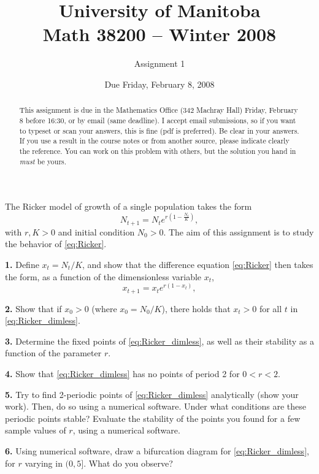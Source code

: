 \documentclass[12pt]{article}
\title{University of Manitoba\\ Math 38200 -- Winter 2008}
\author{Assignment 1}
\date{Due Friday, February 8, 2008}
\theoremstyle{plain}
\begin{document}
\thispagestyle{empty}

\maketitle
\begin{abstract}
This assignment is due in the Mathematics Office (342 Machray Hall) Friday, February 8 before 16:30, or by email (same deadline). I accept email submissions, so if you want to typeset or scan your answers, this is fine (pdf is preferred).
Be clear in your answers. If you use a result in the course notes or from another source, please indicate clearly the reference. You can work on this problem with others, but the solution you hand in \emph{must} be yours. 
\end{abstract}

\vskip1cm
\noindent
The Ricker model of growth of a single population takes the form
\begin{equation}\label{eq:Ricker}
N_{t+1}=N_t e^{r\left(1-\frac{N_t}K\right)},
\end{equation}
with $r,K>0$ and initial condition $N_0>0$. The aim of this assignment is to study the behavior of \eqref{eq:Ricker}.

\vskip1cm
\noindent
{\bf 1.} Define $x_t=N_t/K$, and show that the difference equation \eqref{eq:Ricker} then takes the form, as a function of the dimensionless variable $x_t$,
\begin{equation}\label{eq:Ricker_dimless}
x_{t+1}=x_t e^{r(1-x_t)},
\end{equation}

\vskip0.4cm
\noindent
{\bf 2.} Show that if $x_0>0$ (where $x_0=N_0/K$), there holds that $x_t>0$ for all $t$ in \eqref{eq:Ricker_dimless}.

\vskip0.4cm
\noindent
{\bf 3.} 
Determine the fixed points of \eqref{eq:Ricker_dimless}, as well as their stability as a function of the parameter $r$.

\vskip0.4cm
\noindent
{\bf 4.} 
Show that \eqref{eq:Ricker_dimless} has no points of period 2 for $0<r<2$.

\vskip0.4cm
\noindent
{\bf 5.} 
Try to find 2-periodic points of \eqref{eq:Ricker_dimless} analytically (show your work). Then, do so using a numerical software. Under what conditions are these periodic points stable? Evaluate the stability of the points you found for a few sample values of $r$, using a numerical software.

\vskip0.4cm
\noindent
{\bf 6.} 
Using numerical software, draw a bifurcation diagram for \eqref{eq:Ricker_dimless}, for $r$ varying in $(0,5]$. What do you observe?
\end{document}
